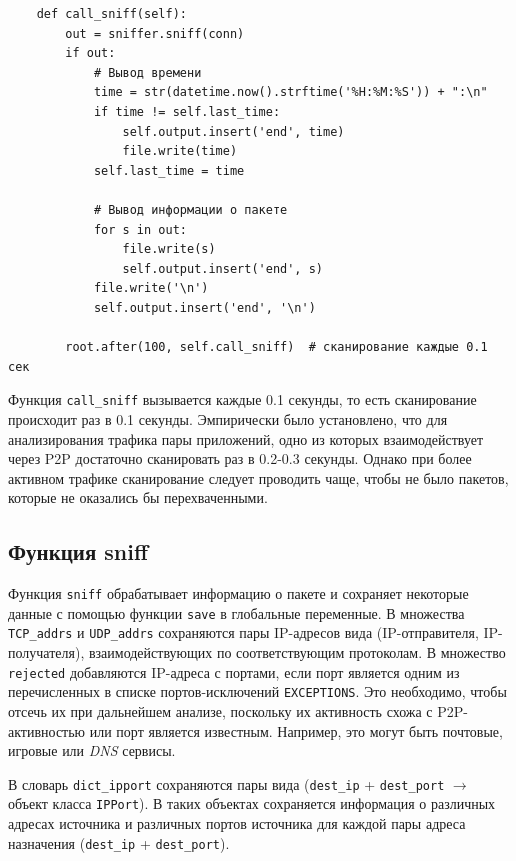 \documentclass[bachelor, och, coursework]{SCWorks}
\begin{document}
\begin{verbatim}
    def call_sniff(self):
        out = sniffer.sniff(conn)
        if out:
            # Вывод времени
            time = str(datetime.now().strftime('%H:%M:%S')) + ":\n"
            if time != self.last_time:
                self.output.insert('end', time)
                file.write(time)
            self.last_time = time

            # Вывод информации о пакете
            for s in out:
                file.write(s)
                self.output.insert('end', s)
            file.write('\n')
            self.output.insert('end', '\n')

        root.after(100, self.call_sniff)  # сканирование каждые 0.1 сек
\end{verbatim}

Функция \texttt{call_sniff} вызывается каждые 0.1 секунды, то есть сканирование происходит раз в 0.1 секунды.
Эмпирически было установлено, что для анализирования трафика пары приложений, одно из которых взаимодействует через P2P достаточно сканировать раз в 0.2-0.3 секунды. Однако при более активном трафике сканирование следует проводить чаще, чтобы не было пакетов, которые не оказались бы перехваченными.

\subsection{Функция sniff}
Функция \texttt{sniff} обрабатывает информацию о пакете и сохраняет некоторые данные с помощью функции \texttt{save} в глобальные переменные.
В множества \texttt{TCP_addrs} и \texttt{UDP_addrs} сохраняются пары IP-адресов вида (IP-отправителя, IP-получателя), взаимодействующих по соответствующим протоколам.
В множество \texttt{rejected} добавляются IP-адреса с портами, если порт является одним из перечисленных в списке портов-исключений \texttt{EXCEPTIONS}. 
Это необходимо, чтобы отсечь их при дальнейшем анализе, поскольку их активность схожа с P2P-активностью или порт является известным. Например, это могут быть почтовые, игровые или \textit{DNS} сервисы. 

В словарь \texttt{dict_ipport} сохраняются пары вида (\texttt{dest_ip} + \texttt{dest_port} $\to$ объект класса \texttt{IPPort}). 
В таких объектах сохраняется информация о различных адресах источника и различных портов источника для каждой пары адреса назначения (\texttt{dest_ip} + \texttt{dest_port}).
\end{document}
